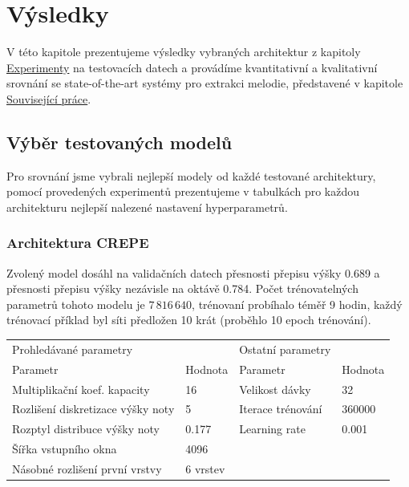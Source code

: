\chapter{Výsledky}\label{chap:vysledky}

V této kapitole prezentujeme výsledky vybraných architektur z kapitoly \hyperref[chap:experimenty]{Experimenty} na testovacích datech a provádíme kvantitativní a kvalitativní srovnání se state-of-the-art systémy pro extrakci melodie, představené v kapitole \hyperref[chap:souvisejici]{Související práce}.

\section{Výběr testovaných modelů}

Pro srovnání jsme vybrali nejlepší modely od každé testované architektury, pomocí provedených experimentů prezentujeme v tabulkách pro každou architekturu nejlepší nalezené nastavení hyperparametrů.

\subsection{Architektura CREPE}

Zvolený model dosáhl na validačních datech přesnosti přepisu výšky 0.689 a přesnosti přepisu výšky nezávisle na oktávě 0.784. Počet trénovatelných parametrů tohoto modelu je $7\,816\,640$, trénovaní probíhalo téměř 9 hodin, každý trénovací příklad byl síti předložen 10 krát (proběhlo 10 epoch trénování).

\begin{table}[h!]
\begin{tabular}{llll}
\hline
\toprule
Prohledávané parametry               &          & Ostatní parametry &         \\
Parametr                             & Hodnota  & Parametr          & Hodnota \\
\midrule
Multiplikační koef. kapacity         & 16       & Velikost dávky    & 32      \\
Rozlišení diskretizace výšky noty    & 5        & Iterace trénování & 360000  \\
Rozptyl distribuce výšky noty & 0.177    & Learning rate     & 0.001   \\
Šířka vstupního okna                 & 4096     &                   &         \\
Násobné rozlišení první vrstvy       & 6 vrstev &                   &         \\
\bottomrule
\end{tabular}
\end{table}

